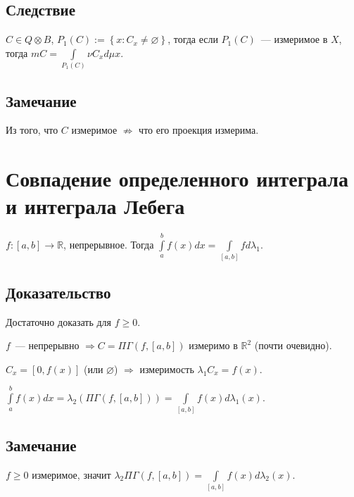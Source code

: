 \documentclass{article}
\begin{document}
        \subsection{Следствие}
        
            $C \in Q \otimes B$, $P_1(C) := \left\{ x : C_x \neq \varnothing \right\}$, тогда если $P_1(C)$~--- измеримое в $X$, тогда $m C = \int\limits_{P_1(C)} \nu C_x d \mu x$.
        
        \subsection{Замечание}
        
            Из того, что $C$ измеримое $\not\Rightarrow$ что его проекция измерима.

    \newpage
    
    \section{Совпадение определенного интеграла и интеграла Лебега}
        
        $f : [a, b] \rightarrow \mathbb{R}$, непрерывное. Тогда $\int\limits^b_a f(x) dx = \int\limits_{[a, b]} f d \lambda_1$.
            
        \subsection{Доказательство}
            
            Достаточно доказать для $f \geqslant 0$. 
                
            $f$~--- непрерывно $\Rightarrow C = \Pi \Gamma \left(f, [a, b] \right)$ измеримо в $\mathbb{R}^2$ (почти очевидно).
                
            $C_x = [0, f(x)]$ (или $\varnothing$) $\Rightarrow$ измеримость $\lambda_1 C_x = f(x)$.
                
            $\int\limits^b_a f(x) dx = \lambda_2 \left( \Pi \Gamma \left( f, [a, b] \right) \right) = \int\limits_{[a, b]} f(x) d \lambda_1 (x)$.
                
        \subsection{Замечание}
            
            $f \geqslant 0$ измеримое, значит $\lambda_2 \Pi \Gamma (f, [a, b]) = \int\limits_{[a, b]} f(x) d \lambda_2(x)$.
            
\end{document}
